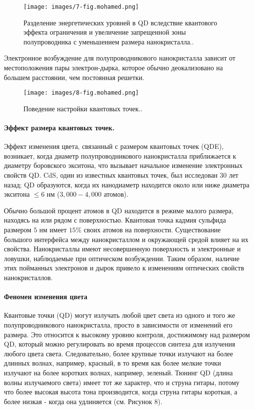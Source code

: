 \documentclass[a4paper,14pt]{extarticle}
\begin{document}
\begin{figure}[htbp]
    \centering
    \texttt{[image: images/7-fig.mohamed.png]}
    \caption{\label{fig:mohamed} Разделение энергетических уровней в QD вследствие квантового эффекта ограничения и увеличение запрещенной зоны полупроводника с уменьшением размера нанокристалла.\cite{mohamed}.}
\end{figure}

Электронное возбуждение для полупроводникового нанокристалла зависит от местоположения пары электрон-дырка, которое обычно деокализовано на большем расстоянии, чем постоянная решетки.

\begin{figure}[htbp]
    \centering
    \texttt{[image: images/8-fig.mohamed.png]}
    \caption{\label{fig:mohamed1} Поведение настройки квантовых точек.\cite{mohamed}.}
\end{figure}

\paragraph{Эффект размера квантовых точек.}

Эффект изменения цвета, связанный с размером квантовых точек (QDE), возникает, когда диаметр полупроводникового нанокристалла приближается к диаметру боровского экситона, что вызывает начальное изменение электронных свойств QD. CdS, один из известных квантовых точек, был исследован 30 лет назад; QD образуются, когда их нанодиаметр находится около или ниже диаметра экситона \( \leq 6 \) нм (\(3,000-4,000\) атомов).

Обычно большой процент атомов в QD находится в режиме малого размера, находясь на или рядом с поверхностью. Квантовая точка кадмия сульфида размером $5$ нм имеет $15\%$ своих атомов на поверхности. Существование большого интерфейса между нанокристаллом и окружающей средой влияет на их свойства. Нанокристаллы имеют несовершенную поверхность и электронные и ловушки, наблюдаемые при оптическом возбуждении. Таким образом, наличие этих пойманных электронов и дырок привело к изменениям оптических свойств нанокристаллов. \cite{sonavane}

\paragraph{Феномен изменения цвета}

Квантовые точки (QD) могут излучать любой цвет света из одного и того же полупроводникового нанокристалла, просто в зависимости от изменений его размера. Это относится к высокому уровню контроля, достижимому над размером QD, который можно регулировать во время процессов синтеза для излучения любого цвета света. Следовательно, более крупные точки излучают на более длинных волнах, например, красный, в то время как более мелкие точки излучают на более коротких волнах, например, зеленый. Тюнинг QD (длина волны излучаемого света) имеет тот же характер, что и струна гитары, потому что более высокая высота тона производится, когда струна гитары короткая, а более низкая - когда она удлиняется (см. Рисунок 8).
\end{document}
